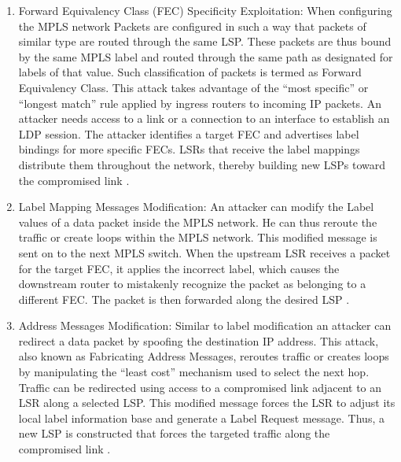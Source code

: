 \begin{enumerate}
\item Forward Equivalency Class (FEC) Specificity Exploitation:
When configuring the MPLS network Packets are configured in such a way that packets of similar type are routed through the same LSP. These packets are thus bound by the same MPLS label and routed through the same path as designated for labels of that value. Such classification of packets is termed as Forward Equivalency Class. This attack takes advantage of the “most specific” or “longest match” rule applied by ingress routers to incoming IP packets. An attacker needs access to a link or a connection to an interface to establish an LDP session. The attacker identifies a target FEC and advertises label bindings for more specific FECs. LSRs that receive the label mappings distribute them throughout the network, thereby building new LSPs toward the compromised link \cite{guernsey2010security}.

\item Label Mapping Messages Modification:
An attacker can modify the Label values of a data packet inside the MPLS network. He can thus reroute the traffic or create loops within the MPLS network. This modified message is sent on to the next MPLS switch. When the upstream LSR receives a packet for the target FEC, it applies the incorrect label, which causes the downstream router to mistakenly recognize the packet as belonging to a different FEC. The packet is then forwarded along the desired LSP \cite{guernsey2010security}.

\item Address Messages Modification:
Similar to label modification an attacker can redirect a data packet by spoofing the destination IP address. This attack, also known as Fabricating Address Messages, reroutes traffic or creates loops by manipulating the “least cost” mechanism used to select the next hop. Traffic can be redirected using access to a compromised link adjacent to an LSR along a selected LSP. This modified message forces the LSR to adjust its local label information base and generate a Label Request message. Thus, a new LSP is constructed that forces the targeted traffic along the compromised link \cite{guernsey2010security}.


\end{enumerate}
